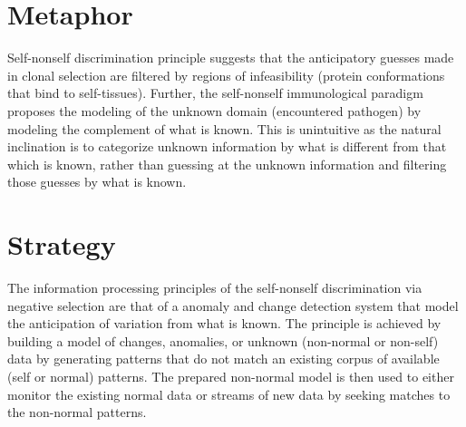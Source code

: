 \documentclass[a4paper, 11pt]{article}
\begin{document}
\section{Metaphor}
\label{sec:metaphor}
Self-nonself discrimination principle suggests that the anticipatory guesses made in clonal selection are filtered by regions of infeasibility (protein conformations that bind to self-tissues). Further, the self-nonself immunological paradigm proposes the modeling of the unknown domain (encountered pathogen) by modeling the complement of what is known. This is unintuitive as the natural inclination is to categorize unknown information by what is different from that which is known, rather than guessing at the unknown information and filtering those guesses by what is known. 

\section{Strategy}
\label{sec:strategy}
The information processing principles of the self-nonself discrimination via negative selection are that of a anomaly and change detection system that model the anticipation of variation from what is known.
The principle is achieved by building a model of changes, anomalies, or unknown (non-normal or non-self) data by generating patterns that do not match an existing corpus of available (self or normal) patterns. The prepared non-normal model is then used to either monitor the existing normal data or streams of new data by seeking matches to the non-normal patterns.
\end{document}
